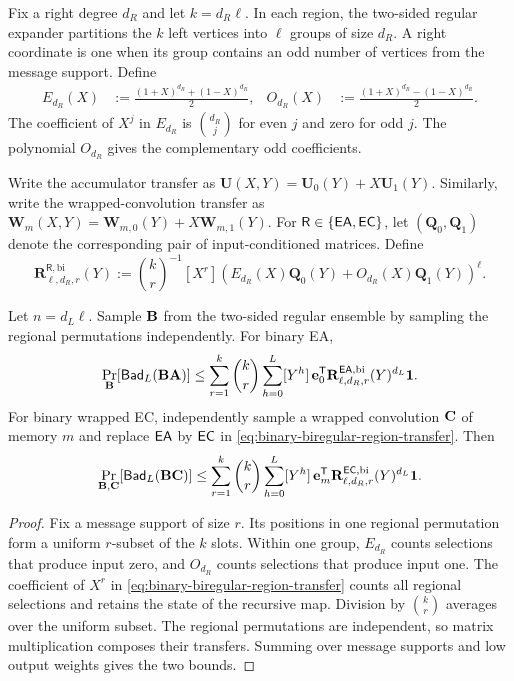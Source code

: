 Fix a right degree $d_R$ and let $k=d_R\ell$.  In each region, the
two-sided regular expander partitions the $k$ left vertices into $\ell$
groups of size $d_R$.  A right coordinate is one when its group contains an
odd number of vertices from the message support.  Define
\begin{align}
 E_{d_R}(X)&:=\frac{(1+X)^{d_R}+(1-X)^{d_R}}2,
 &
 O_{d_R}(X)&:=\frac{(1+X)^{d_R}-(1-X)^{d_R}}2.
 \label{eq:binary-biregular-parity-polynomials}
\end{align}
The coefficient of $X^j$ in $E_{d_R}$ is $\binom{d_R}{j}$ for even $j$
and zero for odd $j$.  The polynomial $O_{d_R}$ gives the complementary
odd coefficients.

Write the accumulator transfer as
$\mathbf U(X,Y)=\mathbf U_0(Y)+X\mathbf U_1(Y)$.  Similarly, write the
wrapped-convolution transfer as
$\mathbf W_m(X,Y)=\mathbf W_{m,0}(Y)+X\mathbf W_{m,1}(Y)$.  For
$\mathsf R\in\{\mathsf{EA},\mathsf{EC}\}$, let $(\mathbf Q_0,\mathbf Q_1)$ denote the
corresponding pair of input-conditioned matrices.  Define
\begin{equation}
 \mathbf R^{\mathsf R,\mathrm{bi}}_{\ell,d_R,r}(Y):=
 \binom{k}{r}^{-1}[X^r]
 \left(E_{d_R}(X)\mathbf Q_0(Y)
       +O_{d_R}(X)\mathbf Q_1(Y)\right)^\ell.
 \label{eq:binary-biregular-region-transfer}
\end{equation}

\begin{theorem}
\label{thm:binary-biregular-first-moment}
Let $n=d_L\ell$.  Sample $\mathbf B$ from the two-sided regular ensemble by
sampling the regional permutations independently.  For binary EA,
\begin{equation}
 \Pr_{\mathbf B}[\mathsf{Bad}_L(\mathbf B\mathbf A)]\leq
 \sum_{r=1}^{k}\binom{k}{r}\sum_{h=0}^{L}[Y^h]\,
 \mathbf e_0^{\mathsf T}
 \mathbf R^{\mathsf{EA},\mathrm{bi}}_{\ell,d_R,r}(Y)^{d_L}\mathbf 1.
 \label{eq:binary-biregular-ea-first-moment}
\end{equation}
For binary wrapped EC, independently sample a wrapped convolution $\mathbf C$ of
memory $m$ and replace $\mathsf{EA}$ by
$\mathsf{EC}$ in \eqref{eq:binary-biregular-region-transfer}.  Then
\begin{equation}
 \Pr_{\mathbf B,\mathbf C}[\mathsf{Bad}_L(\mathbf B\mathbf C)]\leq
 \sum_{r=1}^{k}\binom{k}{r}\sum_{h=0}^{L}[Y^h]\,
 \mathbf e_m^{\mathsf T}
 \mathbf R^{\mathsf{EC},\mathrm{bi}}_{\ell,d_R,r}(Y)^{d_L}\mathbf 1.
 \label{eq:binary-biregular-ec-first-moment}
\end{equation}
\end{theorem}

\begin{proof}
Fix a message support of size $r$.  Its positions in one regional
permutation form a uniform $r$-subset of the $k$ slots.  Within one group,
$E_{d_R}$ counts selections that produce input zero, and $O_{d_R}$ counts
selections that produce input one.  The coefficient of $X^r$ in
\eqref{eq:binary-biregular-region-transfer} counts all regional selections
and retains the state of the recursive map.  Division by $\binom{k}{r}$
averages over the uniform subset.  The regional permutations are independent,
so matrix multiplication composes their transfers.  Summing over message
supports and low output weights gives the two bounds.
\end{proof}

